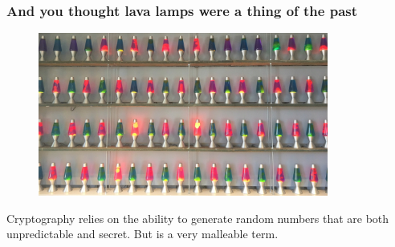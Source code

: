 \documentclass[hyperref={colorlinks=true}]{beamer}
\begin{document}
\begin{frame}%
  \frametitle{And you thought lava lamps were a thing of the past}
  
  \begin{figure}
    \centering
    \includegraphics[width=0.85\textwidth]{LavaLamps.jpg}
  \end{figure}

  Cryptography relies on the ability to generate random numbers that are both unpredictable and  secret. But  is a very malleable term. 

\end{frame}

\end{document}
